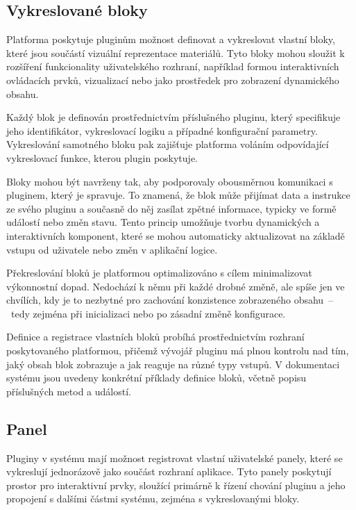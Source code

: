 \subsection{Vykreslované bloky}

Platforma poskytuje pluginům možnost definovat a vykreslovat vlastní bloky, které jsou součástí vizuální reprezentace materiálů.
Tyto bloky mohou sloužit k rozšíření funkcionality uživatelského rozhraní, například formou interaktivních ovládacích prvků, vizualizací nebo jako prostředek pro zobrazení dynamického obsahu.

Každý blok je definován prostřednictvím příslušného pluginu, který specifikuje jeho identifikátor, vykreslovací logiku a případné konfigurační parametry. 
Vykreslování samotného bloku pak zajišťuje platforma voláním odpovídající vykreslovací funkce, kterou plugin poskytuje. 

Bloky mohou být navrženy tak, aby podporovaly obousměrnou komunikaci s pluginem, který je spravuje. 
To znamená, že blok může přijímat data a instrukce ze svého pluginu a současně do něj zasílat zpětné informace, typicky ve formě událostí nebo změn stavu. 
Tento princip umožňuje tvorbu dynamických a interaktivních komponent, které se mohou automaticky aktualizovat na základě vstupu od uživatele nebo změn v aplikační logice.

Překreslování bloků je platformou optimalizováno s cílem minimalizovat výkonnostní dopad. 
Nedochází k němu při každé drobné změně, ale spíše jen ve chvílích, kdy je to nezbytné pro zachování konzistence zobrazeného obsahu~--~tedy zejména při inicializaci nebo po zásadní změně konfigurace.

Definice a registrace vlastních bloků probíhá prostřednictvím rozhraní poskytovaného platformou, přičemž vývojář pluginu má plnou kontrolu nad tím, jaký obsah blok zobrazuje a jak reaguje na různé typy vstupů. 
V dokumentaci systému jsou uvedeny konkrétní příklady definice bloků, včetně popisu příslušných metod a událostí.


\subsection{Panel}

Pluginy v systému mají možnost registrovat vlastní uživatelské panely, které se vykreslují jednorázově jako součást rozhraní aplikace. 
Tyto panely poskytují prostor pro interaktivní prvky, sloužící primárně k řízení chování pluginu a jeho propojení s dalšími částmi systému, zejména s vykreslovanými bloky.

